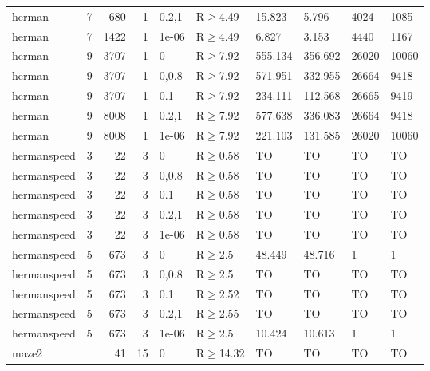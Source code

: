 \begin{longtable}{llrrllllll}
 herman        & 7         &    	680 &    1 & 0.2,1 & R$\geq$4.49  & 15.823   & 5.796    & 4024    & 1085   \\
 herman        & 7         &   	1422 &    1 & 1e-06 & R$\geq$4.49  & 6.827    & 3.153    & 4440    & 1167   \\
 herman        & 9         &   	3707 &    1 & 0     & R$\geq$7.92  & 555.134  & 356.692  & 26020   & 10060  \\
 herman        & 9         &   	3707 &    1 & 0,0.8 & R$\geq$7.92  & 571.951  & 332.955  & 26664   & 9418   \\
 herman        & 9         &   	3707 &    1 & 0.1   & R$\geq$7.92  & 234.111  & 112.568  & 26665   & 9419   \\
 herman        & 9         &   	8008 &    1 & 0.2,1 & R$\geq$7.92  & 577.638  & 336.083  & 26664   & 9418   \\
 herman        & 9         &   	8008 &    1 & 1e-06 & R$\geq$7.92  & 221.103  & 131.585  & 26020   & 10060  \\
 hermanspeed   & 3         &     	22 &    3 & 0     & R$\geq$0.58  & TO       & TO       & TO      & TO     \\
 hermanspeed   & 3         &     	22 &    3 & 0,0.8 & R$\geq$0.58  & TO       & TO       & TO      & TO     \\
 hermanspeed   & 3         &     	22 &    3 & 0.1   & R$\geq$0.58  & TO       & TO       & TO      & TO     \\
 hermanspeed   & 3         &     	22 &    3 & 0.2,1 & R$\geq$0.58  & TO       & TO       & TO      & TO     \\
 hermanspeed   & 3         &     	22 &    3 & 1e-06 & R$\geq$0.58  & TO       & TO       & TO      & TO     \\
 hermanspeed   & 5         &    	673 &    3 & 0     & R$\geq$2.5   & 48.449   & 48.716   & 1       & 1      \\
 hermanspeed   & 5         &    	673 &    3 & 0,0.8 & R$\geq$2.5   & TO       & TO       & TO      & TO     \\
 hermanspeed   & 5         &    	673 &    3 & 0.1   & R$\geq$2.52  & TO       & TO       & TO      & TO     \\
 hermanspeed   & 5         &    	673 &    3 & 0.2,1 & R$\geq$2.55  & TO       & TO       & TO      & TO     \\
 hermanspeed   & 5         &    	673 &    3 & 1e-06 & R$\geq$2.5   & 10.424   & 10.613   & 1       & 1      \\
 maze2         &           &     	41 &   15 & 0     & R$\geq$14.32 & TO       & TO       & TO      & TO     \\

\end{longtable}
